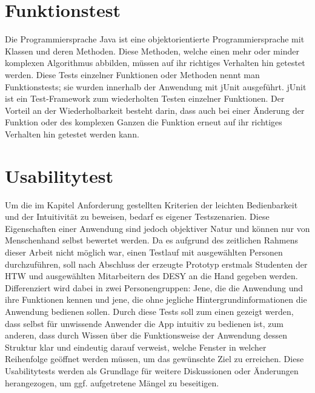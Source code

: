 \documentclass[10pt, a4paper,headsepline,pointednumbers]{scrreprt}
\begin{document}
\section{Funktionstest}
Die Programmiersprache Java ist eine objektorientierte Programmiersprache mit Klassen und deren Methoden. Diese Methoden, welche einen mehr oder minder komplexen Algorithmus abbilden, müssen auf ihr richtiges Verhalten hin getestet werden. Diese Tests einzelner Funktionen oder Methoden nennt man Funktionstests; sie wurden innerhalb der Anwendung mit jUnit ausgeführt. jUnit ist ein Test-Framework zum wiederholten Testen einzelner Funktionen. Der Vorteil an der Wiederholbarkeit besteht darin, dass auch bei einer Änderung der Funktion oder des komplexen Ganzen die Funktion erneut auf ihr richtiges Verhalten hin getestet werden kann.   


\section{Usabilitytest}
Um die im Kapitel Anforderung gestellten Kriterien der leichten Bedienbarkeit und der Intuitivität zu beweisen, bedarf es eigener Testszenarien. Diese Eigenschaften einer Anwendung sind jedoch objektiver Natur und können nur von Menschenhand selbst bewertet werden. Da es aufgrund des zeitlichen Rahmens dieser Arbeit nicht möglich war, einen Testlauf mit ausgewählten Personen durchzuführen, soll nach Abschluss der erzeugte Prototyp erstmals Studenten der HTW und ausgewählten Mitarbeitern des DESY an die Hand gegeben werden. Differenziert wird dabei in zwei Personengruppen: Jene, die die Anwendung und ihre Funktionen kennen und jene, die ohne jegliche Hintergrundinformationen die Anwendung bedienen sollen. Durch diese Tests soll zum einen gezeigt werden, dass  selbst für unwissende Anwender die App intuitiv zu bedienen ist, zum anderen, dass durch Wissen über die Funktionsweise der Anwendung dessen Struktur klar und eindeutig darauf verweist, welche Fenster in welcher Reihenfolge geöffnet werden müssen, um das gewünschte Ziel zu erreichen. Diese Usabilitytests werden als Grundlage für weitere Diskussionen oder Änderungen herangezogen, um ggf. aufgetretene Mängel zu beseitigen.


\end{document}
